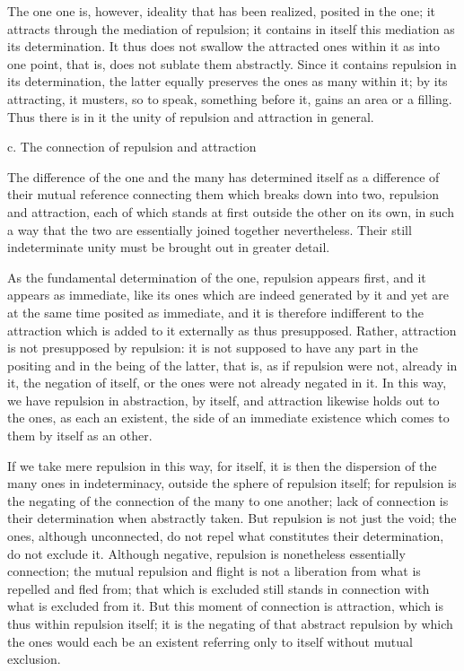 The one one is, however,
ideality that has been realized,
posited in the one;
it attracts through the mediation of repulsion;
it contains in itself this mediation as its determination.
It thus does not swallow the attracted ones
within it as into one point, that is,
does not sublate them abstractly.
Since it contains repulsion in its determination,
the latter equally preserves the ones as many within it;
by its attracting, it musters, so to speak,
something before it, gains an area or a filling.
Thus there is in it the unity
of repulsion and attraction in general.

c. The connection of repulsion and attraction

The difference of the one and the many
has determined itself as a difference
of their mutual reference connecting them
which breaks down into two, repulsion and attraction,
each of which stands at first
outside the other on its own,
in such a way that the two are
essentially joined together nevertheless.
Their still indeterminate unity
must be brought out in greater detail.

As the fundamental determination of the one,
repulsion appears first, and it appears as immediate,
like its ones which are indeed generated by it
and yet are at the same time posited as immediate,
and it is therefore indifferent to the attraction
which is added to it externally as thus presupposed.
Rather, attraction is not presupposed by repulsion:
it is not supposed to have any part in the positing
and in the being of the latter, that is,
as if repulsion were not, already in it,
the negation of itself,
or the ones were not already negated in it.
In this way, we have repulsion in abstraction, by itself,
and attraction likewise holds out to the ones,
as each an existent, the side of an immediate existence
which comes to them by itself as an other.

If we take mere repulsion in this way, for itself,
it is then the dispersion of the many ones in indeterminacy,
outside the sphere of repulsion itself;
for repulsion is the negating of the connection
of the many to one another;
lack of connection is their determination when abstractly taken.
But repulsion is not just the void;
the ones, although unconnected,
do not repel what constitutes their determination,
do not exclude it.
Although negative, repulsion is nonetheless essentially connection;
the mutual repulsion and flight is not a liberation
from what is repelled and fled from;
that which is excluded still stands in connection
with what is excluded from it.
But this moment of connection is attraction,
which is thus within repulsion itself;
it is the negating of that abstract repulsion
by which the ones would each be an existent
referring only to itself without mutual exclusion.

